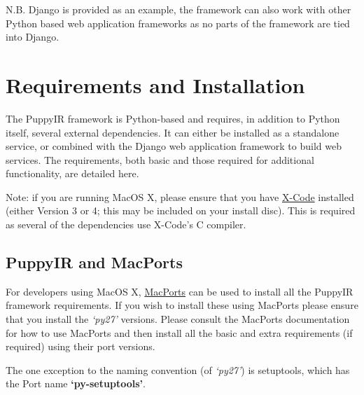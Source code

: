 \documentclass[letterpaper,10pt,english]{sphinxmanual}
\begin{document}
N.B. Django is provided as an example, the framework can also work with other Python based web application frameworks as no parts of the framework are tied into Django.


\section{Requirements and Installation}
\label{installation:requirements-and-installation}\label{installation::doc}\label{installation:id1}
The PuppyIR framework is Python-based and requires, in addition to Python itself, several external dependencies. It can either be installed as a standalone service, or combined with the Django web application framework to build web services. The requirements, both basic and those required for additional functionality, are detailed here.

Note: if you are running MacOS X, please ensure that you have \href{http://developer.apple.com/technologies/tools/}{X-Code} installed (either Version 3 or 4; this may be included on your install disc). This is required as several of the dependencies use X-Code's C compiler.


\subsection{PuppyIR and MacPorts}
\label{installation:puppyir-and-macports}
For developers using MacOS X, \href{http://www.macports.org/}{MacPorts} can be used to install all the PuppyIR framework requirements. If you wish to install these using MacPorts please ensure that you install the \emph{`py27'} versions. Please consult the MacPorts documentation for how to use MacPorts and then install all the basic and extra requirements (if required) using their port versions.

The one exception to the naming convention (of \emph{`py27'}) is setuptools, which has the Port name \textbf{`py-setuptools'}.
\end{document}
